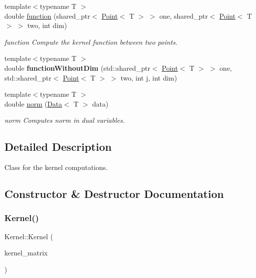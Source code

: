 \begin{DoxyCompactItemize}
\item 
{\footnotesize template$<$typename T $>$ }\\double \hyperlink{class_kernel_a48ef2d6a0786b1a150f75af3f595c536}{function} (shared\+\_\+ptr$<$ \hyperlink{class_point}{Point}$<$ T $>$ $>$ one, shared\+\_\+ptr$<$ \hyperlink{class_point}{Point}$<$ T $>$ $>$ two, int dim)
\begin{DoxyCompactList}\small\item\em function Compute the kernel function between two points. \end{DoxyCompactList}\item 
\mbox{\label{class_kernel_aae7563927691a73b6f20b0194087c035}} 
{\footnotesize template$<$typename T $>$ }\\double {\bfseries function\+Without\+Dim} (std\+::shared\+\_\+ptr$<$ \hyperlink{class_point}{Point}$<$ T $>$ $>$ one, std\+::shared\+\_\+ptr$<$ \hyperlink{class_point}{Point}$<$ T $>$ $>$ two, int j, int dim)
\item 
{\footnotesize template$<$typename T $>$ }\\double \hyperlink{class_kernel_a686e3cd96a93d7742226dedd5beb9da7}{norm} (\hyperlink{class_data}{Data}$<$ T $>$ data)
\begin{DoxyCompactList}\small\item\em norm Computes norm in dual variables. \end{DoxyCompactList}\end{DoxyCompactItemize}


\subsection{Detailed Description}
Class for the kernel computations. 

\subsection{Constructor \& Destructor Documentation}
\mbox{\label{class_kernel_adf23c1567adb8ddb5757931587320871}} 
\subsubsection{\texorpdfstring{Kernel()}{Kernel()}}
{\footnotesize\ttfamily Kernel\+::\+Kernel (\begin{DoxyParamCaption}\item[{d\+Matrix}]{kernel\+\_\+matrix }\end{DoxyParamCaption})}



